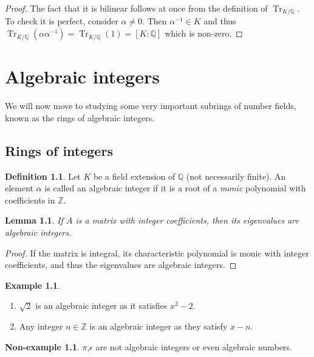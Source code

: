 \documentclass[11pt,a4paper]{report}
\theoremstyle{plain}
\newtheorem{lemma}[subsection]{Lemma}
\theoremstyle{definition}
\newtheorem{definition}[subsection]{Definition}
\newtheorem{exmp}[subsection]{Example}
\newtheorem{nexmp}[subsection]{Non-example}
\theoremstyle{definition}
\newcommand{\Tr}{\operatorname{Tr}}
\newcommand{\ZZ}{\mathbb{Z}}
\def\QQ{\mathbb{Q}}
\def \a{\alpha}
\def \e {\epsilon}
\begin{document}
	\begin{proof}
		The fact that it is bilinear follows at once from the definition of $\Tr_{K/\QQ}$. To check it is perfect, consider $\a \neq 0$. Then $\a^{-1} \in K$ and thus $\Tr_{K/\QQ}(\a \a^{-1})=\Tr_{K/\QQ}(1)=[K:\QQ]$ which is non-zero.
	\end{proof}
	
	
	\chapter{Algebraic integers}
	
	We will now move to studying some very important subrings of number fields, known as the rings of algebraic integers.
	
	\section{Rings of integers}
	\begin{definition}
		Let $K$ be a field extension of $\QQ$ (not necessarily finite). An element $\a$ is called an algebraic integer if it is a root of a \textit{monic} polynomial with coefficients in $\ZZ$.
	\end{definition}
	
	\begin{lemma}\label{lem: roots of int matrix alg ints}
		If $A$ is a matrix with integer coefficients, then its eigenvalues are algebraic integers.
	\end{lemma}
	
	\begin{proof}
		If the matrix is integral, its characteristic polynomial is monic with integer coefficients, and thus the eigenvalues are algebraic integers.
	\end{proof}
	
	\begin{exmp}
		\begin{enumerate}
			\item $\sqrt{2}$ is an algebraic integer as it satisfies $x^2-2$.
			\item Any integer $n \in \ZZ$ is an algebraic integer as they satisfy $x-n$.
			
		\end{enumerate}
	\end{exmp}
	
	\begin{nexmp}
		$\pi$,$\e$ are not algebraic integers or even algebraic numbers.
	\end{nexmp}
	
\end{document}
